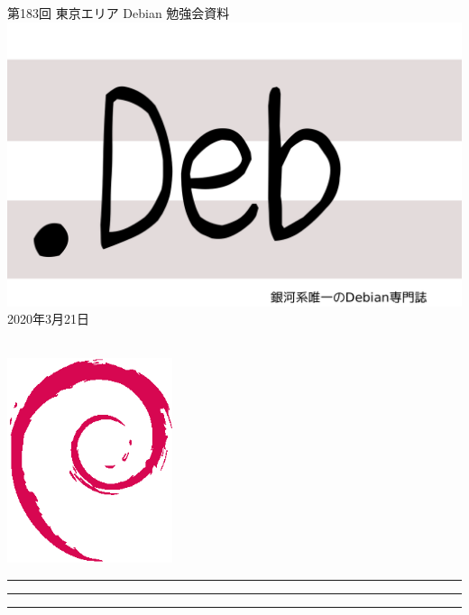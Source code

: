\documentclass[mingoth,a4paper]{jsarticle}
\newcommand{\debmtgyear}{2020}
\newcommand{\debmtgmonth}{3}
\newcommand{\debmtgdate}{21}
\newcommand{\debmtgnumber}{183}
\begin{document}
\begin{titlepage}
\thispagestyle{empty}

\vspace*{-2cm}
第\debmtgnumber{}回 東京エリア Debian 勉強会資料\\
\hspace*{-2cm}
\includegraphics{image2012-natsu/dotdeb.pdf}\\
\hfill{}\debmtgyear{}年\debmtgmonth{}月\debmtgdate{}日

\\

\vspace*{-2cm}
\hfill{}\includegraphics[height=6cm]{image200502/openlogo-nd.eps}
\end{titlepage}

\newpage

\begin{minipage}[b]{0.2\hsize}
 \colorbox{titleback}{}
\end{minipage}
\begin{minipage}[b]{0.8\hsize}
\hrule
\vspace{2mm}
\hrule
\begin{multicols}{2}
\tableofcontents
\end{multicols}
\vspace{2mm}
\hrule
\end{minipage}
\end{document}
